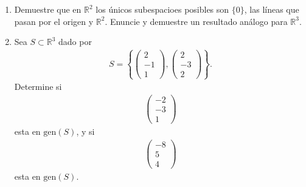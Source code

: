 \documentclass[11pt,letterpaper]{article}
\newcommand{\mR}{\mathbb{R}}
\begin{document}
\begin{enumerate}
\item Demuestre que en $\mR^2$ los únicos subespacioes posibles son $\{0\}$, las líneas que pasan por el origen y $\mR^2$. Enuncie y demuestre un resultado análogo para $\mR^3$.

\item Sea $S\subset \mR^3$ dado por 
\begin{align*}
S=\left\{\begin{pmatrix}
2\\
-1\\
1
\end{pmatrix}, \begin{pmatrix}
2\\
-3\\
2
\end{pmatrix} \right\}.
\end{align*}
Determine si \begin{align*}
\begin{pmatrix}
-2\\
-3\\
1
\end{pmatrix}
\end{align*}
esta en $\text{gen}(S)$, y si \begin{align*}
\begin{pmatrix}
-8\\
5\\
4
\end{pmatrix}
\end{align*}
esta en $\text{gen}(S)$.


\end{enumerate}
\end{document}

